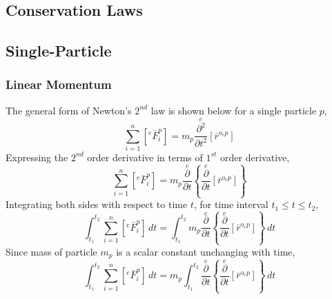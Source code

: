 \documentclass[a4paper, 12pt]{report}
\begin{document}
\begin{center}
\chapter{Conservation Laws}
\begin{comment}
\end{comment}
\section{Single-Particle}
\begin{comment}
\end{comment}
\subsection{Linear Momentum}
\begin{comment}
\end{comment}
The general form of Newton's $2^{nd}$ law is shown below for a single particle $p$,
$$\sum^{n}_{i = 1}\left[{}^{e}\bar{F}^{p}_{i}\right] = m_{p}\overset{e}{\frac{\partial^{2}}{\partial t^{2}}}[\bar{r}^{o_{e}p}]$$
Expressing the $2^{nd}$ order derivative in terms of $1^{st}$ order derivative,
$$\sum^{n}_{i = 1}\left[{}^{e}\bar{F}^{p}_{i}\right] = m_{p}\overset{e}{\frac{\partial}{\partial t}}\left\{\overset{e}{\frac{\partial}{\partial t}}[\bar{r}^{o_{e}p}]\right\}$$
Integrating both sides with respect to time $t$, for time interval $t_{1} \leq t \leq t_{2}$,
$$\int^{t_{2}}_{t_{1}} \sum^{n}_{i = 1}\left[{}^{e}\bar{F}^{p}_{i}\right] \,dt = \int^{t_{2}}_{t_{1}} m_{p}\overset{e}{\frac{\partial}{\partial t}}\left\{\overset{e}{\frac{\partial}{\partial t}}[\bar{r}^{o_{e}p}]\right\} \,dt$$
Since mass of particle $m_{p}$ is a scalar constant unchanging with time,
$$\int^{t_{2}}_{t_{1}} \sum^{n}_{i = 1}\left[{}^{e}\bar{F}^{p}_{i}\right] \,dt = m_{p}\int^{t_{2}}_{t_{1}} \overset{e}{\frac{\partial}{\partial t}}\left\{\overset{e}{\frac{\partial}{\partial t}}[\bar{r}^{o_{e}p}]\right\} \,dt$$


\end{center}
\end{document}

